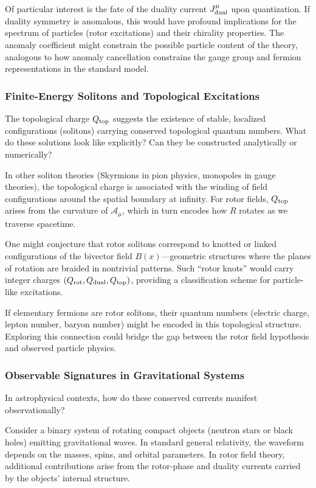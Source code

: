 \documentclass[11pt,a4paper]{article}
\numberwithin{equation}{section}
\theoremstyle{plain}
\theoremstyle{definition}
\theoremstyle{remark}
\begin{document}
Of particular interest is the fate of the duality current $J^\mu_{\rm dual}$ upon quantization. If duality symmetry is anomalous, this would have profound implications for the spectrum of particles (rotor excitations) and their chirality properties. The anomaly coefficient might constrain the possible particle content of the theory, analogous to how anomaly cancellation constrains the gauge group and fermion representations in the standard model.

\subsubsection{Finite-Energy Solitons and Topological Excitations}

The topological charge $Q_{\rm top}$ suggests the existence of stable, localized configurations (solitons) carrying conserved topological quantum numbers. What do these solutions look like explicitly? Can they be constructed analytically or numerically?

In other soliton theories (Skyrmions in pion physics, monopoles in gauge theories), the topological charge is associated with the winding of field configurations around the spatial boundary at infinity. For rotor fields, $Q_{\rm top}$ arises from the curvature of $\mathcal{A}_\mu$, which in turn encodes how $R$ rotates as we traverse spacetime.

One might conjecture that rotor solitons correspond to knotted or linked configurations of the bivector field $B(x)$---geometric structures where the planes of rotation are braided in nontrivial patterns. Such ``rotor knots'' would carry integer charges $(Q_{\rm rot}, Q_{\rm dual}, Q_{\rm top})$, providing a classification scheme for particle-like excitations.

If elementary fermions are rotor solitons, their quantum numbers (electric charge, lepton number, baryon number) might be encoded in this topological structure. Exploring this connection could bridge the gap between the rotor field hypothesis and observed particle physics.

\subsubsection{Observable Signatures in Gravitational Systems}

In astrophysical contexts, how do these conserved currents manifest observationally?

Consider a binary system of rotating compact objects (neutron stars or black holes) emitting gravitational waves. In standard general relativity, the waveform depends on the masses, spins, and orbital parameters. In rotor field theory, additional contributions arise from the rotor-phase and duality currents carried by the objects' internal structure.
\end{document}

